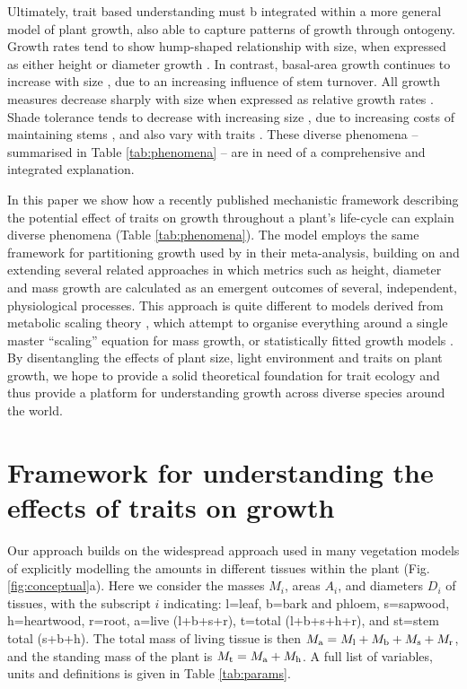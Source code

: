 \documentclass[a4paper,11pt]{article}
\begin{document}
Ultimately, trait based understanding must b integrated within a more general model of plant growth, also able to capture patterns of growth through ontogeny. Growth rates tend to show hump-shaped relationship with size, when expressed as either height \citep{Sillett-2010, King-2011} or diameter growth \citep{Herault-2011}.  In contrast, basal-area growth continues to increase with size \citep{Sillett-2010, Stephenson-2014}, due to an increasing influence of stem turnover. All growth measures decrease sharply with size when expressed as relative growth rates \citep{Rees-2010, Iida-2014}. Shade tolerance tends to decrease with increasing size \citep{Lusk-2006}, due to increasing costs of maintaining stems \citep{Givnish-1988}, and also vary with traits \citep{Lusk-2006,Poorter-2006}. These diverse phenomena -- summarised in Table \ref{tab:phenomena} -- are in need of a comprehensive and integrated explanation.

In this paper we show how a recently published mechanistic framework \plant{} \citep{Falster-2016} describing the potential effect of traits on growth throughout a plant's life-cycle can explain diverse phenomena (Table \ref{tab:phenomena}). The model employs the same framework for partitioning growth used by \citet{Gibert-2016} in their meta-analysis, building on and extending several related approaches \citep{Givnish-1988, Yokozawa-1995, Makela-1997, Moorcroft-2001, Falster-2011, King-2011} in which metrics such as height, diameter and mass growth are calculated as an emergent outcomes of several, independent, physiological processes. This approach is quite different to models derived from metabolic scaling theory \citep{Enquist-1999, Enquist-2007}, which attempt to organise everything around a single master ``scaling'' equation for mass growth, or statistically fitted growth models \citep[e.g.][]{Herault-2011, Ruger-2012, Iida-2014}. By disentangling the effects of plant size, light environment and traits on plant growth, we hope to provide a solid theoretical foundation for trait ecology and thus provide a platform for understanding growth across diverse species around the world.

\section{Framework for understanding the effects of traits on growth}

Our approach builds on the widespread approach used in many vegetation models of explicitly modelling the amounts in different tissues within the plant \citep[e.g.][]{Givnish-1988, Makela-1997, Moorcroft-2001, Sitch-2008, Falster-2011, King-2011, DeKauwe-2014} (Fig. \ref{fig:conceptual}a). Here we consider the masses $M_i$, areas $A_i$, and diameters $D_i$ of tissues, with the subscript $i$ indicating: l=leaf, b=bark and phloem, s=sapwood, h=heartwood, r=root, a=live (l+b+s+r), t=total (l+b+s+h+r), and st=stem total (s+b+h). The total mass of living tissue is then $M_{\rm a}=M_{\rm l}+M_{\rm b}+M_{\rm s}+M_{\rm r}$, and the standing mass of the plant is $M_{\rm t}=M_{\rm a}+M_{\rm h}$. A full list of variables, units and definitions is given in Table \ref{tab:params}.
\end{document}
